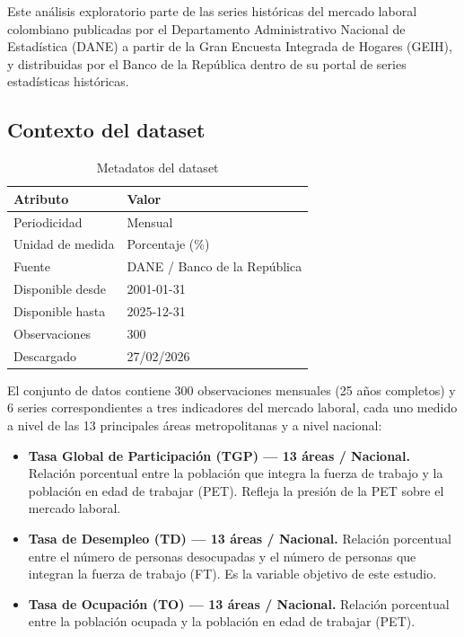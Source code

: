 \documentclass[11pt,a4paper]{article}
\begin{document}
Este análisis exploratorio parte de las series históricas del mercado laboral colombiano publicadas por el Departamento Administrativo Nacional de Estadística (DANE) a partir de la Gran Encuesta Integrada de Hogares (GEIH), y distribuidas por el Banco de la República dentro de su portal de series estadísticas históricas.

\subsection{Contexto del dataset}

\begin{table}[H]
    \centering
    \caption{Metadatos del dataset}
    \begin{tabular}{ll}
        \toprule
        \textbf{Atributo} & \textbf{Valor} \\
        \midrule
        Periodicidad & Mensual \\
        Unidad de medida & Porcentaje (\%) \\
        Fuente & DANE / Banco de la República \\
        Disponible desde & 2001-01-31 \\
        Disponible hasta & 2025-12-31 \\
        Observaciones & 300 \\
        Descargado & 27/02/2026 \\
        \bottomrule
    \end{tabular}
\end{table}

El conjunto de datos contiene 300 observaciones mensuales (25 años completos) y 6 series correspondientes a tres indicadores del mercado laboral, cada uno medido a nivel de las 13 principales áreas metropolitanas y a nivel nacional:

\begin{itemize}
    \item \textbf{Tasa Global de Participación (TGP) — 13 áreas / Nacional.} Relación porcentual entre la población que integra la fuerza de trabajo y la población en edad de trabajar (PET). Refleja la presión de la PET sobre el mercado laboral.
    \item \textbf{Tasa de Desempleo (TD) — 13 áreas / Nacional.} Relación porcentual entre el número de personas desocupadas y el número de personas que integran la fuerza de trabajo (FT). Es la variable objetivo de este estudio.
    \item \textbf{Tasa de Ocupación (TO) — 13 áreas / Nacional.} Relación porcentual entre la población ocupada y la población en edad de trabajar (PET).
\end{itemize}
\end{document}
